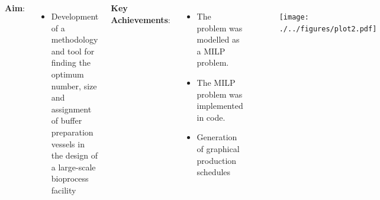 \documentclass{beamer}
\begin{document}
\begin{frame}
\begin{columns}
            \scriptsize \textbf{Aim}:
            \begin{itemize}
                \item  Development of a methodology and tool
                for finding the optimum number, size and assignment of buffer
                preparation vessels in the design of a large-scale bioprocess
                facility
            \end{itemize}
            \textbf{Key Achievements}:
            \begin{itemize}
                \item The problem was modelled as a MILP problem.
                \item The MILP problem was implemented in code.
                \item Generation of graphical production schedules 
            \end{itemize}

            \begin{figure}
                \centering
                \texttt{[image: ./../figures/plot2.pdf]}
            \end{figure}  
    \end{columns}
\end{frame}
\end{document}
